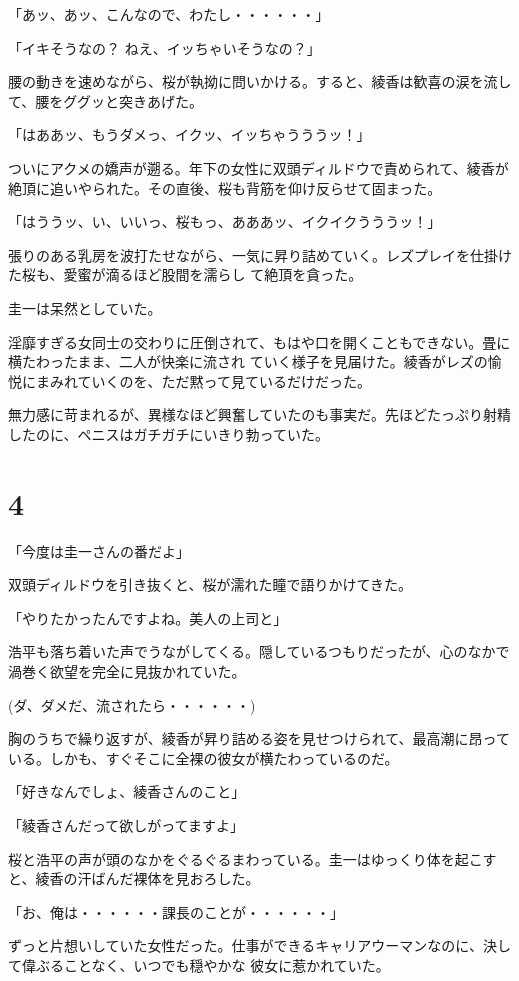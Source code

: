 ﻿\documentclass[book,tate]{jlreq}
\begin{document}
「あッ、あッ、こんなので、わたし・・・・・・」

「イキそうなの？ ねえ、イッちゃいそうなの？」

腰の動きを速めながら、桜が執拗に問いかける。すると、綾香は歓喜の涙を流して、腰をググッと突きあげた。

「はああッ、もうダメっ、イクッ、イッちゃうううッ！」

ついにアクメの嬌声が遡る。年下の女性に双頭ディルドウで責められて、綾香が絶頂に追いやられた。その直後、桜も背筋を仰け反らせて固まった。

「はううッ、い、いいっ、桜もっ、あああッ、イクイクうううッ！」

張りのある乳房を波打たせながら、一気に昇り詰めていく。レズプレイを仕掛けた桜も、愛蜜が滴るほど股間を濡らし て絶頂を貪った。

圭一は呆然としていた。

淫靡すぎる女同士の交わりに圧倒されて、もはや口を開くこともできない。畳に横たわったまま、二人が快楽に流され ていく様子を見届けた。綾香がレズの愉悦にまみれていくのを、ただ黙って見ているだけだった。

無力感に苛まれるが、異様なほど興奮していたのも事実だ。先ほどたっぷり射精したのに、ペニスはガチガチにいきり勃っていた。

\section*{4}

「今度は圭一さんの番だよ」

双頭ディルドウを引き抜くと、桜が濡れた瞳で語りかけてきた。

「やりたかったんですよね。美人の上司と」

浩平も落ち着いた声でうながしてくる。隠しているつもりだったが、心のなかで渦巻く欲望を完全に見抜かれていた。

(ダ、ダメだ、流されたら・・・・・・)

胸のうちで繰り返すが、綾香が昇り詰める姿を見せつけられて、最高潮に昂っている。しかも、すぐそこに全裸の彼女が横たわっているのだ。

「好きなんでしょ、綾香さんのこと」

「綾香さんだって欲しがってますよ」

桜と浩平の声が頭のなかをぐるぐるまわっている。圭一はゆっくり体を起こすと、綾香の汗ばんだ裸体を見おろした。

「お、俺は・・・・・・課長のことが・・・・・・」

ずっと片想いしていた女性だった。仕事ができるキャリアウーマンなのに、決して偉ぶることなく、いつでも穏やかな 彼女に惹かれていた。
\end{document}
